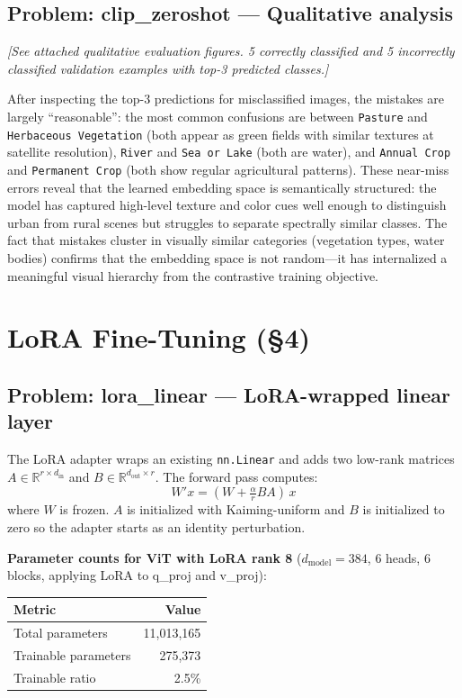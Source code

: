 \documentclass[11pt]{article}
\begin{document}
\subsection*{Problem: clip\_zeroshot --- Qualitative analysis}

\textit{[See attached qualitative evaluation figures. 5 correctly classified
and 5 incorrectly classified validation examples with top-3 predicted
classes.]}

After inspecting the top-3 predictions for misclassified images, the
mistakes are largely ``reasonable'': the most common confusions are between
\texttt{Pasture} and \texttt{Herbaceous Vegetation} (both appear as green
fields with similar textures at satellite resolution), \texttt{River} and
\texttt{Sea or Lake} (both are water), and \texttt{Annual Crop} and
\texttt{Permanent Crop} (both show regular agricultural patterns). These
near-miss errors reveal that the learned embedding space is semantically
structured: the model has captured high-level texture and color cues well
enough to distinguish urban from rural scenes but struggles to separate
spectrally similar classes. The fact that mistakes cluster in visually similar
categories (vegetation types, water bodies) confirms that the embedding space
is not random---it has internalized a meaningful visual hierarchy from the
contrastive training objective.

\section{LoRA Fine-Tuning (\S{}4)}

\subsection*{Problem: lora\_linear --- LoRA-wrapped linear layer}

The LoRA adapter wraps an existing \texttt{nn.Linear} and adds two
low-rank matrices $A \in \mathbb{R}^{r \times d_{\mathrm{in}}}$ and
$B \in \mathbb{R}^{d_{\mathrm{out}} \times r}$. The forward pass computes:
\[
  W'x = (W + \tfrac{\alpha}{r} BA)\,x
\]
where $W$ is frozen. $A$ is initialized with Kaiming-uniform and $B$ is
initialized to zero so the adapter starts as an identity perturbation.

\textbf{Parameter counts for ViT with LoRA rank 8}
($d_{\mathrm{model}}=384$, 6 heads, 6 blocks, applying LoRA to q\_proj and v\_proj):
\begin{center}
\begin{tabular}{lr}
\toprule
Metric & Value \\
\midrule
Total parameters      & 11{,}013{,}165 \\
Trainable parameters  & 275{,}373 \\
Trainable ratio       & 2.5\% \\
\bottomrule
\end{tabular}
\end{center}
\end{document}
